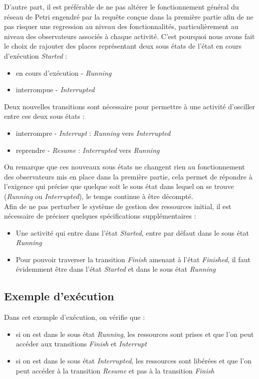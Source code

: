 D'autre part, il est préférable de ne pas altérer le fonctionnement général du réseau de Petri engendré par la requête conçue dans la première partie afin de ne pas risquer une regression au niveau des fonctionnalités, particulièrement au niveau des observateurs associés à chaque activité. C'est pourquoi nous avons fait le choix de rajouter des places représentant deux sous états de l'état en cours d'exécution \textit{Started} :
\begin{itemize}
\item en cours d'exécution - \textit{Running}
\item interrompue - \textit{Interrupted}
\end{itemize}
Deux nouvelles transitions sont nécessaire pour permettre à une activité d'osciller entre ces deux sous états :
\begin{itemize}
\item interrompre - \textit{Interrupt} : \textit{Running} vers \textit{Interrupted}
\item reprendre - \textit{Resume} : \textit{Interrupted} vers \textit{Running}
\end{itemize}
On remarque que ces nouveaux sous états ne changent rien au fonctionnement des observateurs mis en place dans la première partie, cela permet de répondre à l'exigence qui précise que quelque soit le sous état dans lequel on se trouve (\textit{Running} ou \textit{Interrupted}), le temps continue à être décompté.\\

Afin de ne pas perturber le système de gestion des ressources initial, il est nécessaire de préciser quelques spécifications supplémentaires :
\begin{itemize}
\item Une activité qui entre dans l'état \textit{Started}, entre par défaut dans le sous état \textit{Running}
\item Pour pouvoir traverser la transition \textit{Finish} amenant à l'état \textit{Finished}, il faut évidemment être dans l'état \textit{Started} et dans le sous état \textit{Running}
\end{itemize}

\subsection{Exemple d'exécution}

Dans cet exemple d'exécution, on vérifie que :
\begin{itemize}
\item si on est dans le sous état \textit{Running}, les ressources sont prises et que l'on peut accéder aux transitions \textit{Finish} et \textit{Interrupt}
\item si on est dans le sous état \textit{Interrupted}, les ressources sont libérées et que l'on peut accéder à la transition \textit{Resume} et pas à la transition \textit{Finish}\\
\end{itemize}

